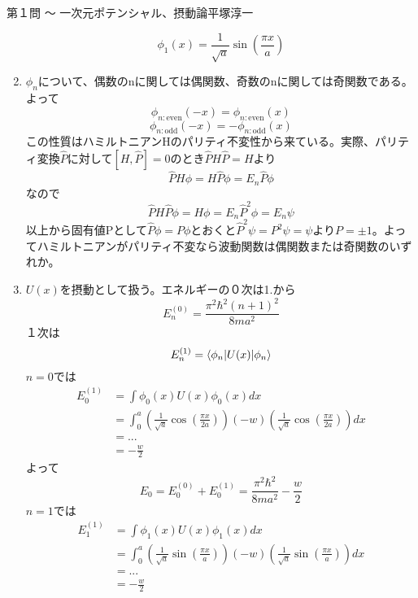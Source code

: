 \begin{answer}{第１問 〜 一次元ポテンシャル、摂動論}{平塚淳一}
\begin{enumerate}
\begin{equation}
  \phi_1(x)=\frac{1}{\sqrt{a}}\sin(\frac{\pi x}{a})
  \end{equation}
\item $\phi_n$について、偶数のnに関しては偶関数、奇数のnに関しては奇関数である。よって
  \begin{equation}
  \phi_{n:\mathrm{even}}(-x)=\phi_{n:\mathrm{even}}(x)
  \end{equation}
  \begin{equation}
  \phi_{n:\mathrm{odd}}(-x)=- \phi_{n:\mathrm{odd}}(x)
  \end{equation}
  この性質はハミルトニアンHのパリティ不変性から来ている。実際、パリティ変換$\hat P$に対して$[H,\hat P]=0$のとき$\hat PH\hat P=H$より
  \begin{equation}
  \hat PH\phi=H\hat P\phi=E_n\hat P\phi
  \end{equation}
  なので
  \begin{equation}
  \hat PH\hat P\phi=H\phi=E_n\hat P^2\phi=E_n\psi
  \end{equation}
  以上から固有値Pとして$\hat P\phi=P\phi$とおくと$\hat P^2\psi=P^2\psi=\psi$より$P=\pm1$。よってハミルトニアンがパリティ不変なら波動関数は偶関数または奇関数のいずれか。
\item $U(x)$を摂動として扱う。エネルギーの０次は1.から
  \begin{equation}
  E_n^{(0)}=\frac{\pi^2\hbar^2(n+1)^2}{8ma^2}
  \end{equation}
  １次は
  \begin{equation}
  E_n^{(1)}=\langle\phi_n|U(x)|\phi_n\rangle
  \end{equation}
  $n=0$では
  \begin{align}
  E_0^{(1)}&=\int \phi_0(x)U(x)\phi_0(x)dx \\
  &=\int_0^a (\frac{1}{\sqrt{a}}\cos(\frac{\pi x}{2a}))(-w)(\frac{1}{\sqrt{a}}\cos(\frac{\pi x}{2a}))dx \\
  &=... \\
  &=- \frac{w}{2}
  \end{align}
  よって
  \begin{equation}
  E_0=E_0^{(0)}+E_0^{(1)}
  =\frac{\pi^2\hbar^2}{8ma^2}- \frac{w}{2}
  \end{equation}
  $n=1$では
  \begin{align}
  E_1^{(1)}&=\int \phi_1(x)U(x)\phi_1(x)dx \\
  &=\int_0^a (\frac{1}{\sqrt{a}}\sin(\frac{\pi x}{a}))(-w)(\frac{1}{\sqrt{a}}\sin(\frac{\pi x}{a}))dx \\
  &=...\\
  &=- \frac{w}{2}

\end{align}
\end{enumerate}
\end{answer}
